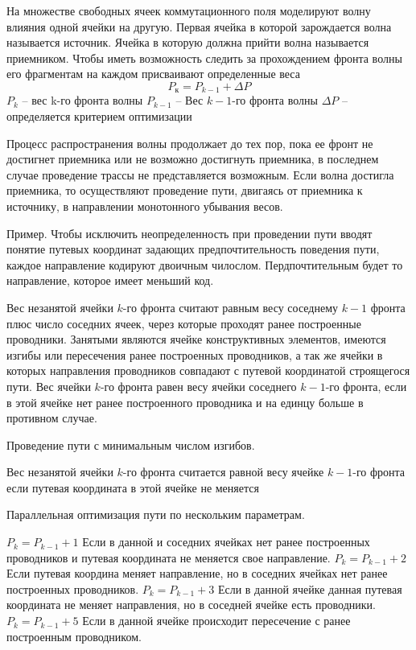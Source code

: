\documentclass{article}
\begin{document}
На множестве свободных ячеек коммутационного поля моделируют волну влияния одной ячейки на другую. Первая ячейка в которой зарождается волна называется источник. Ячейка в которую должна прийти волна называется приемником.
Чтобы иметь возможность следить за прохождением фронта волны его фрагментам на каждом присваивают определенные веса
$$
P_к = P_{k-1} + \Delta P
$$
$P_k$ -- вес k-го фронта волны
$P_{k-1}$ -- Вес $k - 1$-го фронта волны
$ \Delta P$ -- определяется критерием оптимизации

Процесс распространения волны продолжает до тех пор, пока ее фронт не достигнет приемника или не возможно достигнуть приемника, в последнем случае проведение трассы не представляется возможным. Если волна достигла приемника, то осуществляют проведение пути, двигаясь от приемника к источнику, в направлении монотонного убывания весов.

Пример.
Чтобы исключить неопределенность при проведении пути вводят понятие путевых координат задающих предпочтительность поведения пути, каждое направление кодируют двоичным чилослом. Пердпочтительным будет то направление, которое имеет меньший код.

Вес незанятой ячейки $k$-го фронта считают равным весу соседнему $k-1$ фронта плюс число соседних ячеек, через которые проходят ранее построенные проводники.
Занятыми являются ячейке конструктивных элементов, имеются изгибы или пересечения ранее построенных проводников, а так же ячейки в которых направления проводников совпадают с путевой координатой строящегося пути. Вес ячейки $k$-го фронта равен весу ячейки соседнего $k-1$-го фронта, если в этой ячейке нет ранее построенного проводника и на единцу больше в противном случае.

Проведение пути с минимальным числом изгибов.

Вес незанятой ячейки $k$-го фронта считается равной весу ячейке $k-1$-го фронта если путевая координата в этой ячейке не меняется

Параллельная оптимизация пути по нескольким параметрам.

$P_k = P_{k - 1} + 1$ Если в данной и соседних ячейках нет ранее построенных проводников и путевая координата не меняется свое направление.
$P_k = P_{k-1} + 2$ Если путевая координа меняет направление, но в соседних ячейках нет ранее построенных проводников.
$P_k = P_{k-1} + 3$ Если в данной ячейке данная путевая координата не меняет направления, но в соседней ячейке есть проводники.
$P_k = P_{k-1} + 5$ Если в данной ячейке происходит пересечение с ранее построенным проводником.
\end{document}
